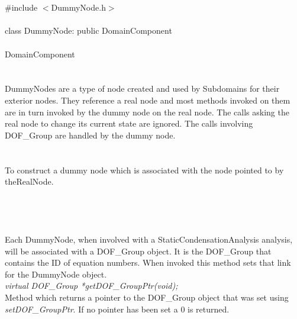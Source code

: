 
 \\

   \\
\indent \#include $<$DummyNode.h$>$  \\

  \\
\indent class DummyNode: public DomainComponent  \\



 \\
\indent DomainComponent \\
\indent{} \\

  \\
\indent DummyNodes are a type of node created and used by Subdomains for their
exterior nodes. They reference a real node and most methods invoked on
them are in turn invoked by the dummy node on the real node. The calls
asking the real node to change its current state are ignored. The
calls involving DOF\_Group are handled by the dummy node. \\


  \\
  \\
To construct a dummy node which is associated with the node pointed to
by \p theRealNode. \\

  \\
 \\

  \\
 \\
Each DummyNode, when involved with a StaticCondensationAnalysis
analysis, will be associated with a DOF\_Group object. It is the
DOF\_Group that contains the ID of equation numbers. When invoked this
method sets that link for the DummyNode object. \\ 


{\em virtual DOF\_Group *getDOF\_GroupPtr(void);} \\
Method which returns a pointer to the DOF\_Group object that was set
using {\em setDOF\_GroupPtr}. If no pointer has been set a $0$ is
returned. \\


